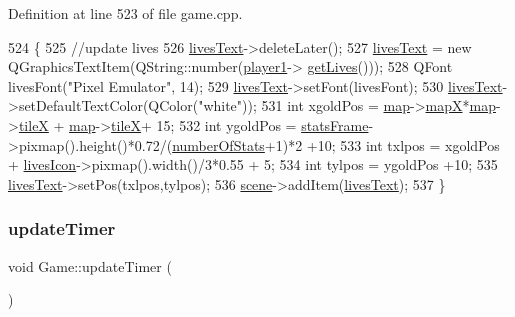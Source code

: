 Definition at line 523 of file game.\+cpp.


\begin{DoxyCode}
524 \{
525     \textcolor{comment}{//update lives}
526     \hyperlink{class_game_ab83806346d49346a645bc850c51e331c}{livesText}->deleteLater();
527     \hyperlink{class_game_ab83806346d49346a645bc850c51e331c}{livesText} = \textcolor{keyword}{new} QGraphicsTextItem(QString::number(\hyperlink{class_game_ad8a7cc146f99c7ec5b7c3c25d73f118c}{player1}->
      \hyperlink{class_player1_afb2adc7bd83c6380fbb85a832e083f4d}{getLives}()));
528     QFont livesFont(\textcolor{stringliteral}{"Pixel Emulator"}, 14);
529     \hyperlink{class_game_ab83806346d49346a645bc850c51e331c}{livesText}->setFont(livesFont);
530     \hyperlink{class_game_ab83806346d49346a645bc850c51e331c}{livesText}->setDefaultTextColor(QColor(\textcolor{stringliteral}{"white"}));
531     \textcolor{keywordtype}{int} xgoldPos = \hyperlink{class_game_acef3a39fdf14be2c980b0dc11e7be402}{map}->\hyperlink{class_map_acfd20721da29a2e353598555e23e12f0}{mapX}*\hyperlink{class_game_acef3a39fdf14be2c980b0dc11e7be402}{map}->\hyperlink{class_map_af2aa425dd22aba483ae973c4a15fe934}{tileX} + \hyperlink{class_game_acef3a39fdf14be2c980b0dc11e7be402}{map}->\hyperlink{class_map_af2aa425dd22aba483ae973c4a15fe934}{tileX}+ 15;
532     \textcolor{keywordtype}{int} ygoldPos = \hyperlink{class_game_a3b40718d348c0f12af63a3f428924ab4}{statsFrame}->pixmap().height()*0.72/(\hyperlink{class_game_af041d097dc2350360c7951e5a41bc48a}{numberOfStats}+1)*2 +10;
533     \textcolor{keywordtype}{int} txlpos = xgoldPos + \hyperlink{class_game_acd6dae5d8f0c5670fa81433f5b329e0f}{livesIcon}->pixmap().width()/3*0.55 + 5;
534     \textcolor{keywordtype}{int} tylpos = ygoldPos +10;
535     \hyperlink{class_game_ab83806346d49346a645bc850c51e331c}{livesText}->setPos(txlpos,tylpos);
536     \hyperlink{class_game_a8119e3b9a632906c6808fa294b46a92a}{scene}->addItem(\hyperlink{class_game_ab83806346d49346a645bc850c51e331c}{livesText});
537 \}
\end{DoxyCode}
\mbox{\label{class_game_a89ee6bc4da77b30b9ab09d6148944cda}} 
\subsubsection{\texorpdfstring{update\+Timer}{updateTimer}}
{\footnotesize\ttfamily void Game\+::update\+Timer (\begin{DoxyParamCaption}{ }\end{DoxyParamCaption})\hspace{0.3cm}{\ttfamily [slot]}}



